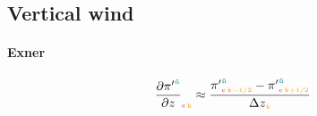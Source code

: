 \clearpage
\subsection{Vertical wind}
\label{sub:vertical_wind}

\paragraph{Exner}

\begin{equation}
  \exnerprimedz{\ntilde}{\c}{\k} \approx \frac{\exnerprime{\ntilde}{\c}{\k-1/2} - \exnerprime{\ntilde}{\c}{\k+1/2}}{\Dz{\k}}
\end{equation}
